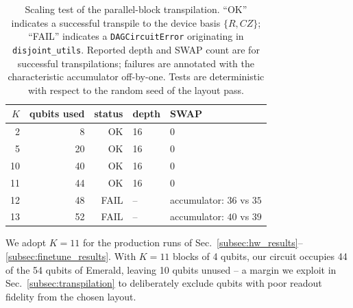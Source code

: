 \begin{table}[h]
\centering
\caption{Scaling test of the parallel-block transpilation. ``OK'' indicates a successful transpile to the device basis $\{R, CZ\}$; ``FAIL'' indicates a \texttt{DAGCircuitError} originating in \texttt{disjoint\_utils}. Reported depth and SWAP count are for successful transpilations; failures are annotated with the characteristic accumulator off-by-one. Tests are deterministic with respect to the random seed of the layout pass.}
\label{tab:compat_scaling}
\begin{tabular}{rrrll}
\toprule
$K$ & qubits used & status & depth & SWAP \\
\midrule
2  &  8 & OK   & 16 & 0 \\
5  & 20 & OK   & 16 & 0 \\
10 & 40 & OK   & 16 & 0 \\
11 & 44 & OK   & 16 & 0 \\
12 & 48 & FAIL & --  & accumulator: $36$ vs $35$ \\
13 & 52 & FAIL & --  & accumulator: $40$ vs $39$ \\
\bottomrule
\end{tabular}
\end{table}

We adopt $K=11$ for the production runs of Sec.~\ref{subsec:hw_results}--\ref{subsec:finetune_results}. With $K=11$ blocks of 4 qubits, our circuit occupies 44 of the 54 qubits of Emerald, leaving 10 qubits unused -- a margin we exploit in Sec.~\ref{subsec:transpilation} to deliberately exclude qubits with poor readout fidelity from the chosen layout.

